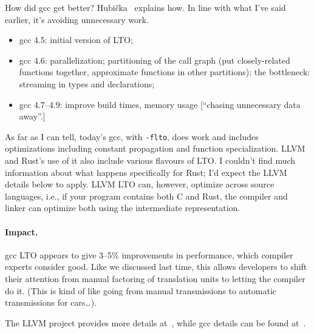 How did gcc get better?
Hubi\v{c}ka~\cite{hubicka15:_link_gcc} explains how. In line with what I've said earlier, it's
avoiding unnecessary work.
\begin{itemize}[noitemsep]
\item gcc 4.5: initial version of LTO;
\item gcc 4.6: parallelization; partitioning of the call graph (put closely-related functions together, approximate functions in other partitions); the bottleneck: streaming in types and declarations;
\item gcc 4.7--4.9: improve build times, memory usage [``chasing unnecessary data away''.]
\end{itemize}
As far as I can tell, today's gcc, with {\tt -flto}, does work and includes
optimizations including constant propagation and function
specialization. LLVM and Rust's use of it also include various flavours of LTO.
I couldn't find much information about what happens specifically for Rust; I'd expect the
LLVM details below to apply. LLVM LTO can, however,
optimize across source languages, i.e., if your program contains both C and Rust,
the compiler and linker can optimize both using the intermediate representation.

\paragraph{Impact.} gcc LTO appears to give 3--5\% improvements in performance, which compiler experts consider good.
Like we discussed last time, this allows developers to shift their attention from 
manual factoring of translation units to letting the compiler do it. (This is kind of like going
from manual transmissions to automatic transmissions for cars\ldots).

The LLVM project provides more details at~\cite{project17:_llvm_link_time_optim}, while gcc details
can be found at~\cite{novillo09:_linkt}.





